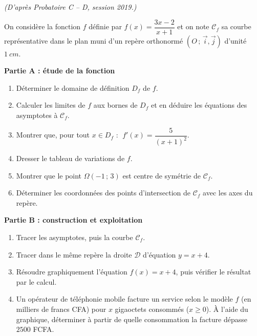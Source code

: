 \documentclass[11pt]{article}
\begin{document}
\begin{exercice}
\emph{(D'après Probatoire C -- D, session 2019.)}

On considère la fonction $f$ définie par $f(x)=\dfrac{3x-2}{x+1}$ et on note $\mathscr{C}_f$ sa courbe représentative dans le plan muni d'un repère orthonormé $(O\,;\,\vec{i},\vec{j})$ d'unité $\SI{1}{cm}$.

\textbf{Partie A : étude de la fonction}
\begin{enumerate}
\item Déterminer le domaine de définition $D_f$ de $f$.
\item Calculer les limites de $f$ aux bornes de $D_f$ et en déduire les équations des asymptotes à $\mathscr{C}_f$.
\item Montrer que, pour tout $x\in D_f$ : $\;f'(x)=\dfrac{5}{(x+1)^2}$.
\item Dresser le tableau de variations de $f$.
\item Montrer que le point $\Omega(-1\,;\,3)$ est centre de symétrie de $\mathscr{C}_f$.
\item Déterminer les coordonnées des points d'intersection de $\mathscr{C}_f$ avec les axes du repère.
\end{enumerate}

\textbf{Partie B : construction et exploitation}
\begin{enumerate}
\item Tracer les asymptotes, puis la courbe $\mathscr{C}_f$.
\item Tracer dans le même repère la droite $\mathscr{D}$ d'équation $y=x+4$.
\item Résoudre graphiquement l'équation $f(x)=x+4$, puis vérifier le résultat par le calcul.
\item Un opérateur de téléphonie mobile facture un service selon le modèle $f$ (en milliers de francs CFA) pour $x$ gigaoctets consommés ($x\geq 0$). À l'aide du graphique, déterminer à partir de quelle consommation la facture dépasse $\num{2500}$ FCFA.
\end{enumerate}
\end{exercice}
\end{document}
